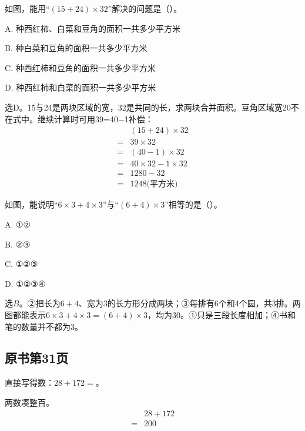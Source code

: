 如图，能用“\((15+24)\times32\)”解决的问题是（\hspace{1.8em}）。\par
\noindent A. 种西红柿、白菜和豆角的面积一共多少平方米\par
\noindent B. 种白菜和豆角的面积一共多少平方米\par
\noindent C. 种西红柿和豆角的面积一共多少平方米\par
\noindent D. 种西红柿和白菜的面积一共多少平方米\par
{}
\begin{BookAnswer}
选D。15与24是两块区域的宽，32是共同的长，求两块合并面积。豆角区域宽20不在式中。继续计算时可用39=40−1补偿：\[\begin{aligned}&(15+24)\times32\\={}&39\times32\\={}&(40-1)\times32\\={}&40\times32-1\times32\\={}&1280-32\\={}&1248\text{(平方米)}\end{aligned}\]
\end{BookAnswer}

如图，能说明“\(6\times3+4\times3\)”与“\((6+4)\times3\)”相等的是（\hspace{1.8em}）。\par
\noindent A. ①②\par
\noindent B. ②③\par
\noindent C. ①②③\par
\noindent D. ①②③④\par
{}
\begin{BookAnswer}
选\(B\)。②把长为\(6+4\)、宽为3的长方形分成两块；③每排有6个和4个圆，共3排。两图都能表示\(6\times3+4\times3=(6+4)\times3\)，均为30。①只是三段长度相加；④书和笔的数量并不都为3。
\end{BookAnswer}



\subsection*{原书第31页}

直接写得数：\(28+172=\)。\par
\begin{BookAnswer}
两数凑整百。\[\begin{aligned} &28+172\\={}&200\end{aligned}\]
\end{BookAnswer}

